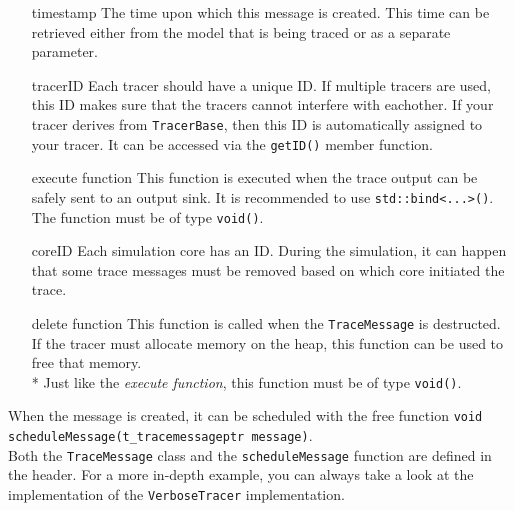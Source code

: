 \begin{itemize}
	\item[timestamp] The time upon which this message is created. This time can be retrieved either from the model that is being traced or as a separate parameter.
	\item[tracerID] Each tracer should have a unique ID. If multiple tracers are used, this ID makes sure that the tracers cannot interfere with eachother. If your tracer derives from \lstinline{TracerBase}, then this ID is automatically assigned to your tracer. It can be accessed via the \lstinline{getID()} member function.
	\item[execute function] This function is executed when the trace output can be safely sent to an output sink. It is recommended to use \lstinline{std::bind<...>()}. The function must be of type \lstinline{void()}.
	\item[coreID] Each simulation core has an ID. During the simulation, it can happen that some trace messages must be removed based on which core initiated the trace.
	\item[delete function] This function is called when the \lstinline{TraceMessage} is destructed. If the tracer must allocate memory on the heap, this function can be used to free that memory.\\*
		Just like the \emph{execute function}, this function must be of type \lstinline{void()}.
\end{itemize}
When the message is created, it can be scheduled with the free function \lstinline{void scheduleMessage(t_tracemessageptr message)}.\\
Both the \lstinline{TraceMessage} class and the \lstinline{scheduleMessage} function are defined in the  header. For a more in-depth example, you can always take a look at the implementation of the \lstinline{VerboseTracer} implementation.